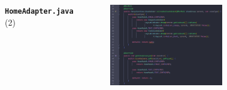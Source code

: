 \documentclass{beamer}
\begin{document}
\begin{frame}
\begin{columns}
\begin{figure}
        \end{figure}
        \indent \textbf{\texttt{HomeAdapter.java}} (2)
        \begin{figure}
            \centering
            \includegraphics[width=\textwidth]{images/19.png}
        \end{figure}
    \end{columns}
\end{frame}
\end{document}
